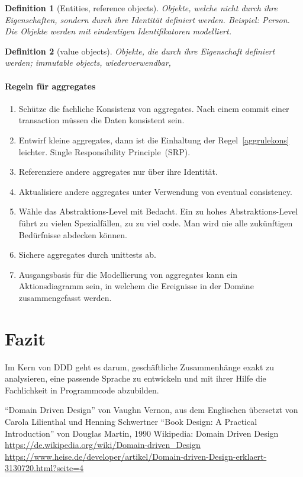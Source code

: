 \documentclass[11pt,a4paper]{scrartcl}
\newtheorem{Def}{Definition}[section]
\begin{document}
\begin{Def}[Entities, reference objects]
	Objekte, welche nicht durch ihre Eigenschaften, sondern durch ihre Identität definiert werden. Beispiel: Person. Die Objekte werden mit eindeutigen Identifikatoren modelliert.
\end{Def}

\begin{Def}[value objects]
	Objekte, die durch ihre Eigenschaft definiert werden; immutable objects, wiederverwendbar,
\end{Def}

\paragraph{Regeln für aggregates}
\begin{enumerate}
	\item\label{aggrulekons} Schütze die fachliche Konsistenz von aggregates. Nach einem commit einer transaction müssen die Daten konsistent sein.
	\item Entwirf kleine aggregates, dann ist die Einhaltung der Regel~\ref{aggrulekons} leichter. Single Responsibility Principle~(SRP).
	\item Referenziere andere aggregates nur über ihre Identität.
	\item Aktualisiere andere aggregates unter Verwendung von eventual consistency.
	\item Wähle das Abstraktions-Level mit Bedacht. Ein zu hohes Abstraktions-Level führt zu vielen Spezialfällen, zu zu viel code. Man wird nie alle zukünftigen Bedürfnisse abdecken können.
	\item Sichere aggregates durch unittests ab.
	\item Ausgangsbasis für die Modellierung von aggregates kann ein Aktionsdiagramm sein, in welchem die Ereignisse in der Domäne zusammengefasst werden.
\end{enumerate}

\section{Fazit}

Im Kern von DDD geht es darum, geschäftliche Zusammenhänge exakt zu analysieren, eine passende Sprache zu entwickeln und mit ihrer Hilfe die Fachlichkeit in Programmcode abzubilden.

\nocite{*} %

\begin{thebibliography}{\hspace{1cm}}
	 ``Domain Driven Design'' von Vaughn Vernon, aus dem Englischen übersetzt von Carola Lilienthal und Henning Schwertner
	 ``Book Design: A Practical Introduction'' von Douglas Martin, 1990
	 Wikipedia: Domain Driven Design \url{https://de.wikipedia.org/wiki/Domain-driven_Design}
	 \url{https://www.heise.de/developer/artikel/Domain-driven-Design-erklaert-3130720.html?seite=4}
\end{thebibliography}
\end{document}
